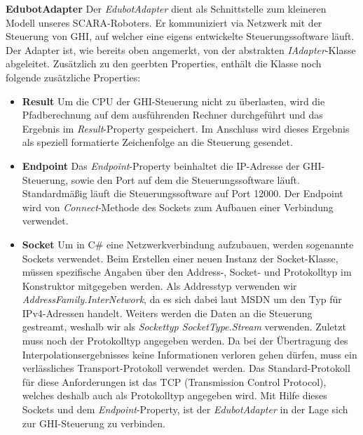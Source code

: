 \textbf{EdubotAdapter}
\newline
Der \textit{EdubotAdapter} dient als Schnittstelle zum kleineren Modell unseres SCARA-Roboters. Er kommuniziert via Netzwerk mit der Steuerung von GHI, auf welcher eine eigens entwickelte Steuerungssoftware läuft. Der Adapter ist, wie bereits oben angemerkt, von der abstrakten \textit{IAdapter}-Klasse abgeleitet. Zusätzlich zu den geerbten Properties, enthält die Klasse noch folgende zusätzliche Properties:
\begin{itemize}
\item \textbf{Result}
\newline
Um die CPU der GHI-Steuerung nicht zu überlasten, wird die Pfadberechnung auf dem ausführenden Rechner durchgeführt und das Ergebnis im \textit{Result}-Property gespeichert. Im Anschluss wird dieses Ergebnis als speziell formatierte Zeichenfolge an die Steuerung gesendet.
\item \textbf{Endpoint}
\newline
Das \textit{Endpoint}-Property beinhaltet die IP-Adresse der GHI-Steuerung, sowie den Port auf dem die Steuerungssoftware läuft. Standardmäßig läuft die Steuerungssoftware auf Port 12000. Der Endpoint wird von \textit{Connect}-Methode des Sockets zum Aufbauen einer Verbindung verwendet.
\item \textbf{Socket}
\newline
Um in C\# eine Netzwerkverbindung aufzubauen, werden sogenannte Sockets verwendet. Beim Erstellen einer neuen Instanz der Socket-Klasse, müssen spezifische Angaben über den Address-, Socket- und Protokolltyp im Konstruktor mitgegeben werden.
Als Addresstyp verwenden wir \textit{AddressFamily.InterNetwork}, da es sich dabei laut MSDN um den Typ für IPv4-Adressen handelt. Weiters werden die Daten an die Steuerung gestreamt, weshalb wir als \textit{Sockettyp SocketType.Stream} verwenden. Zuletzt muss noch der Protokolltyp angegeben werden. Da bei der Übertragung des Interpolationsergebnisses keine Informationen verloren gehen dürfen, muss ein verlässliches Transport-Protokoll verwendet werden. Das Standard-Protokoll für diese Anforderungen ist das TCP (Transmission Control Protocol), welches deshalb auch als Protokolltyp angegeben wird.
Mit Hilfe dieses Sockets und dem \textit{Endpoint}-Property, ist der \textit{EdubotAdapter} in der Lage sich zur GHI-Steuerung zu verbinden.
\end{itemize}

